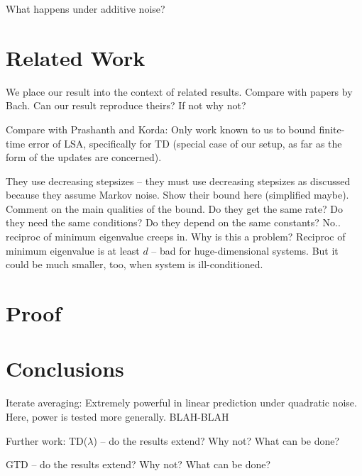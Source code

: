 \documentclass{article}
\begin{document}
What happens under additive noise?

\section{Related Work}
We place our result into the context of related results.
Compare with papers by Bach. Can our result reproduce theirs?
If not why not? 

Compare with Prashanth and Korda:
Only work known to us to bound finite-time error of LSA,
specifically for TD (special case of our setup,
as far as the form of the updates are concerned).

They use decreasing stepsizes -- they must use decreasing stepsizes
as discussed because they assume Markov noise.
Show their bound here (simplified maybe).
Comment on the main qualities of the bound.
Do they get the same rate?
Do they need the same conditions?
Do they depend on the same constants? No.. reciproc of minimum eigenvalue creeps in.
Why is this a problem? Reciproc of minimum eigenvalue is at least $d$ -- bad for huge-dimensional systems.
But it could be much smaller, too, when system is ill-conditioned.

\section{Proof}
\label{sec:proof}
\section{Conclusions}
Iterate averaging: Extremely powerful in linear prediction under quadratic noise.
Here, power is tested more generally.
BLAH-BLAH

Further work:
TD($\lambda$) -- do the results extend? Why not? What can be done?

GTD -- do the results extend? Why not? What can be done?







\fi
%
%
%
%
%
%

%
%
%
%
%
%
%
%
%


\fi
\nocite{langley00}


\end{document}
